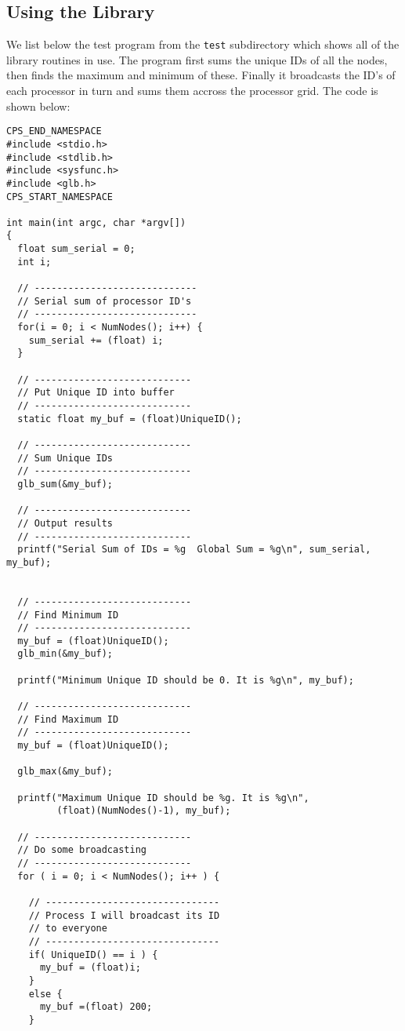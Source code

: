 \subsection{Using the Library}
We list below the test program from the {\tt test} subdirectory which 
shows all of the library routines in use. The program first sums the 
unique IDs of all the nodes, then finds the maximum and minimum of these.
Finally it broadcasts the ID's of each processor in turn and sums 
them accross the processor grid. The code is shown below:
{\small
\begin{verbatim}
CPS_END_NAMESPACE
#include <stdio.h>
#include <stdlib.h>
#include <sysfunc.h>
#include <glb.h>
CPS_START_NAMESPACE

int main(int argc, char *argv[])
{
  float sum_serial = 0;
  int i;

  // -----------------------------
  // Serial sum of processor ID's
  // -----------------------------
  for(i = 0; i < NumNodes(); i++) {
    sum_serial += (float) i;
  }

  // ----------------------------
  // Put Unique ID into buffer
  // ----------------------------
  static float my_buf = (float)UniqueID();

  // ----------------------------
  // Sum Unique IDs
  // ----------------------------
  glb_sum(&my_buf);

  // ----------------------------
  // Output results
  // ----------------------------
  printf("Serial Sum of IDs = %g  Global Sum = %g\n", sum_serial, my_buf);


  // ----------------------------
  // Find Minimum ID
  // ----------------------------
  my_buf = (float)UniqueID();
  glb_min(&my_buf);

  printf("Minimum Unique ID should be 0. It is %g\n", my_buf);

  // ----------------------------
  // Find Maximum ID
  // ----------------------------
  my_buf = (float)UniqueID();

  glb_max(&my_buf);

  printf("Maximum Unique ID should be %g. It is %g\n", 
         (float)(NumNodes()-1), my_buf);

  // ----------------------------
  // Do some broadcasting
  // ----------------------------
  for ( i = 0; i < NumNodes(); i++ ) {

    // -------------------------------
    // Process I will broadcast its ID
    // to everyone
    // -------------------------------
    if( UniqueID() == i ) {
      my_buf = (float)i;
    }
    else { 
      my_buf =(float) 200;
    }


\end{verbatim}}
